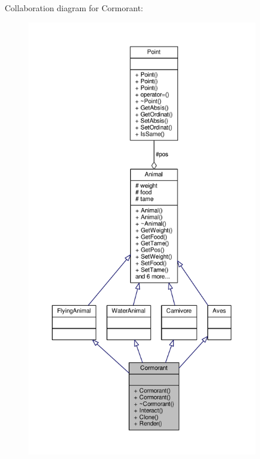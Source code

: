 Collaboration diagram for Cormorant\+:
\nopagebreak
\begin{figure}[H]
\begin{center}
\leavevmode
\includegraphics[height=550pt]{classCormorant__coll__graph}
\end{center}
\end{figure}
